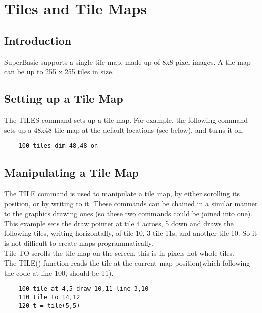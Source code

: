 \chapter{Tiles and Tile Maps}

\section{Introduction}

SuperBasic supports a single tile map, made up of 8x8 pixel images. A tile map can be up to 255 x 255 tiles in size.

\section{Setting up a Tile Map}

The TILES command sets up a tile map. For example, the following command sets up a 48x48 tile map at the default locations (see below), and turns it on.

\begin{verbatim}
	100 tiles dim 48,48 on
\end{verbatim}

\section{Manipulating a Tile Map}

The TILE command is used to manipulate a tile map, by either scrolling its position, or by writing to it.  These commands can be chained in a similar manner to the graphics drawing ones (so these two commands could be joined into one).\\

This example sets the draw pointer at tile 4 across, 5 down and draws the following tiles, writing horizontally, of tile 10, 3 tile 11s, and another tile 10. So it is not difficult to create maps programmatically.\\

Tile TO scrolls the tile map on the screen, this is in pixels not whole tiles.\\

The TILE() function reads the tile at the current map position(which following the code at line 100, should be 11).

\begin{verbatim}
	100 tile at 4,5 draw 10,11 line 3,10
	110 tile to 14,12
	120 t = tile(5,5)
\end{verbatim}
		

